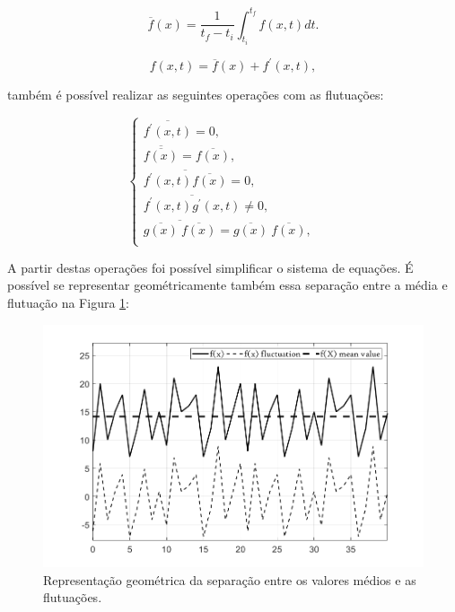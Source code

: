 \begin{equation}
  \overline{f}({x})=\frac{1}{t_f - t_i} \int_{t_i}^{t_f} f({x} , t) dt.
\end{equation}

\begin{equation}
  f({x} , t) = \overline{f}({x}) + f^\prime ({x} ,t),
\end{equation}

também é possível realizar as seguintes operações com as flutuações:

\begin{equation}
  \begin{cases}
  \overline{f^\prime ({x} ,t)} = 0 , & \quad   \\
  \overline{\overline{f({x})}} = \overline{f({x})} , & \quad   \\
  \overline{f^\prime ({x} ,t)\overline{f({x})}} = 0 ,& \quad   \\
  \overline{f^\prime ({x} ,t)g^\prime ({x} ,t)} \neq 0 , & \quad   \\
  \overline{  \overline{g({x})} \ \overline{f({x})}  } = {\overline{g({x})}} \ {\overline{f({x})}} , & \quad   \\
  \end{cases}
\end{equation}

A partir destas operações foi possível simplificar o sistema de equações. É possível se representar geométricamente também essa separação entre a média e flutuação na Figura \ref{figura.1}:

\begin{figure}[h!]
	\centering
	\includegraphics[angle=0, scale=0.60]{medios}
	\caption{Representação geométrica da separação entre os valores médios e as flutuações.}
	\label{figura.1}
\end{figure}

